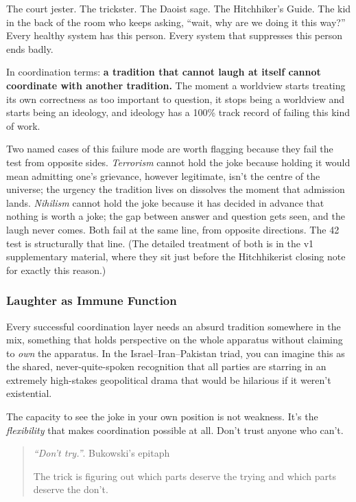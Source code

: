 \documentclass[
]{article}
\begin{document}
The court jester. The trickster. The Daoist sage. The Hitchhiker's
Guide. The kid in the back of the room who keeps asking, ``wait, why are
we doing it this way?'' Every healthy system has this person. Every
system that suppresses this person ends badly.

In coordination terms: \textbf{a tradition that cannot laugh at itself
cannot coordinate with another tradition.} The moment a worldview starts
treating its own correctness as too important to question, it stops
being a worldview and starts being an ideology, and ideology has a 100\%
track record of failing this kind of work.

Two named cases of this failure mode are worth flagging because they
fail the test from opposite sides. \emph{Terrorism} cannot hold the joke
because holding it would mean admitting one's grievance, however
legitimate, isn't the centre of the universe; the urgency the tradition
lives on dissolves the moment that admission lands. \emph{Nihilism}
cannot hold the joke because it has decided in advance that nothing is
worth a joke; the gap between answer and question gets seen, and the
laugh never comes. Both fail at the same line, from opposite directions.
The 42 test is structurally that line. (The detailed treatment of both
is in the v1 supplementary material, where they sit just before the
Hitchhikerist closing note for exactly this reason.)

\subsubsection{Laughter as Immune
Function}\label{laughter-as-immune-function}

Every successful coordination layer needs an absurd tradition somewhere
in the mix, something that holds perspective on the whole apparatus
without claiming to \emph{own} the apparatus. In the
Israel--Iran--Pakistan triad, you can imagine this as the shared,
never-quite-spoken recognition that all parties are starring in an
extremely high-stakes geopolitical drama that would be hilarious if it
weren't existential.

The capacity to see the joke in your own position is not weakness. It's
the \emph{flexibility} that makes coordination possible at all. Don't
trust anyone who can't.

\begin{quote}
\emph{``Don't try.''}. Bukowski's epitaph

The trick is figuring out which parts deserve the trying and which parts
deserve the don't.
\end{quote}
\end{document}
